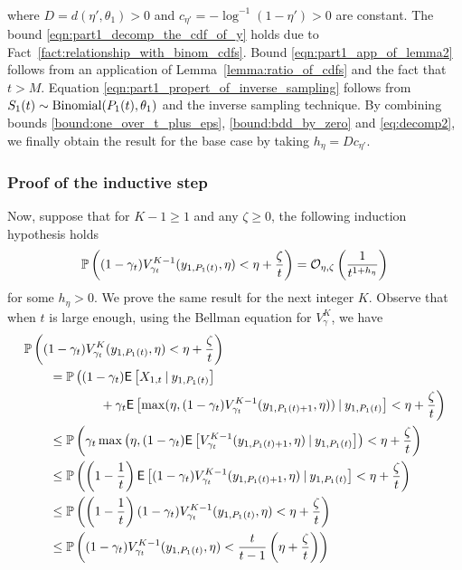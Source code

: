 \begin{myproof}[Proof.]
\begin{align}
	\end{align}
	where $D = d(\eta',\theta_1) > 0$ and $c_{\eta'} = -\log^{-1}(1-\eta') > 0$ are constant. The bound \eqref{eqn:part1_decomp_the_cdf_of_y} holds due to Fact~\eqref{fact:relationship_with_binom_cdfs}. Bound \eqref{eqn:part1_app_of_lemma2} follows from an application of Lemma~\ref{lemma:ratio_of_cdfs} and the fact that $t > M$. Equation \eqref{eqn:part1_propert_of_inverse_sampling} follows from $S_1(t) \sim \text{Binomial}(P_{1}(t), \theta_1)$ and the inverse sampling technique. By combining bounds \eqref{bound:one_over_t_plus_eps}, \eqref{bound:bdd_by_zero} and \eqref{eq:decomp2}, we finally obtain the result for the base case by taking $h_\eta = Dc_{\eta'}$.

	\subsubsection*{Proof of the inductive step}
	 Now, suppose that for $K-1 \ge 1$ and any $\zeta \ge 0$,  the following induction hypothesis holds
	\[
	\mathbb{P} \left( (1-\gamma_t)V^{K-1}_{\gamma_t}(y_{1,P_{1}(t)}, \eta) < \eta + \frac{\zeta}{t} \right) = \mathcal{O}_{\eta,\zeta}\left(\frac{1}{t^{1 + h_\eta}}\right)
	\]
	for some $h_\eta > 0$. We prove the same result for the next integer $K$. Observe that when $t$ is large enough, using the Bellman equation for $V^K_\gamma$, we have
	\begin{align}
	&\P{(1-\gamma_t)V^K_{\gamma_t}(y_{1,\Nt{1}}, \eta) < \eta + \frac{\zeta}{t}} \nonumber  \\
	&\qquad = \mathbb{P}\left((1-\gamma_t)\Ee{X_{1,t} \given y_{1,\Nt{1}}}  \right. \nonumber\\
	&\hspace{6em} + \gamma_t \Ee{\max(\eta, (1-\gamma_t)V^{K-1}_{\gamma_t}(y_{1,\Nt{1}+1}, \eta)) \given y_{1,\Nt{1}}} < \eta + \frac{\zeta}{t}\bigg) \label{eq:appl_of_lemma_9} \\
	& \qquad \le \P{ \gamma_t \max\left(\eta, (1-\gamma_t)\Ee{V^{K-1}_{\gamma_{t}}(y_{1,\Nt{1}+1}, \eta ) \given y_{1,\Nt{1}}}\right)< \eta + \frac{\zeta}{t}} \label{ineq:appl_jensens} \\
	& \qquad \le \P{ \left(1-\frac{1}{t}\right) \Ee{(1-\gamma_t)V^{K-1}_{\gamma_{t}}(y_{1,\Nt{1}+1}, \eta) \given y_{1,\Nt{1}} }< \eta + \frac{\zeta}{t}} \nonumber \\
	& \qquad \le \P{\left(1-\frac{1}{t}\right)(1-\gamma_t) V^{K-1}_{\gamma_{t}}(y_{1,\Nt{1}}, \eta)< \eta  + \frac{\zeta}{t}} \label{ineq:missing_step} \\
	& \qquad \le \P{ (1-\gamma_t)V^{K-1}_{\gamma_{t}}(y_{1,\Nt{1}}, \eta)< \frac{t}{t-1}\left(\eta +  \frac{\zeta}{t}}\right) \nonumber \\

\end{align}
\end{myproof}
